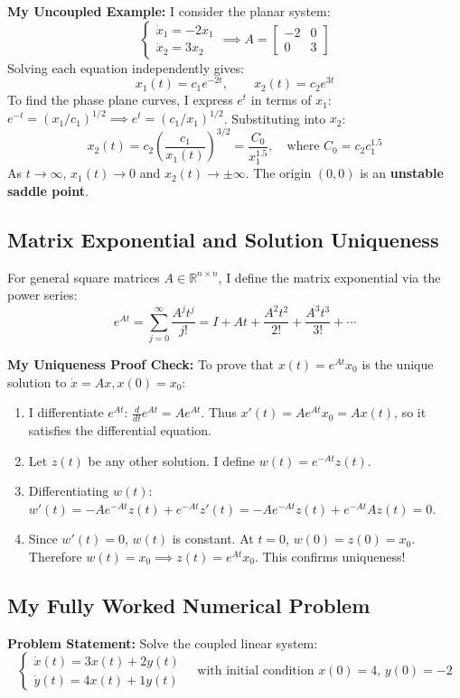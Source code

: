 \documentclass[12pt,a4paper]{article}
\theoremstyle{definition}
\theoremstyle{plain}
\begin{document}
\textbf{My Uncoupled Example:} I consider the planar system:
\[
\begin{cases}
\dot{x}_1 = -2 x_1 \\
\dot{x}_2 = 3 x_2
\end{cases}
\implies A = \begin{bmatrix} -2 & 0 \\ 0 & 3 \end{bmatrix}
\]
Solving each equation independently gives:
\[
x_1(t) = c_1 e^{-2t}, \qquad x_2(t) = c_2 e^{3t}
\]
To find the phase plane curves, I express $e^t$ in terms of $x_1$: $e^{-t} = (x_1 / c_1)^{1/2} \implies e^t = (c_1 / x_1)^{1/2}$. Substituting into $x_2$:
\[
x_2(t) = c_2 \left( \frac{c_1}{x_1(t)} \right)^{3/2} = \frac{C_0}{x_1^{1.5}}, \quad \text{where } C_0 = c_2 c_1^{1.5}
\]
As $t \to \infty$, $x_1(t) \to 0$ and $x_2(t) \to \pm \infty$. The origin $(0,0)$ is an \textbf{unstable saddle point}.

\subsection{Matrix Exponential and Solution Uniqueness}
For general square matrices $A \in \mathbb{R}^{n \times n}$, I define the matrix exponential via the power series:
\[
e^{At} = \sum_{j=0}^{\infty} \frac{A^j t^j}{j!} = I + A t + \frac{A^2 t^2}{2!} + \frac{A^3 t^3}{3!} + \cdots
\]

\textbf{My Uniqueness Proof Check:} To prove that $x(t) = e^{At} x_0$ is the unique solution to $\dot{x} = A x, x(0) = x_0$:
\begin{enumerate}
    \item I differentiate $e^{At}$: $\frac{d}{dt} e^{At} = A e^{At}$. Thus $x'(t) = A e^{At} x_0 = A x(t)$, so it satisfies the differential equation.
    \item Let $z(t)$ be any other solution. I define $w(t) = e^{-At} z(t)$.
    \item Differentiating $w(t)$: $w'(t) = -A e^{-At} z(t) + e^{-At} z'(t) = -A e^{-At} z(t) + e^{-At} A z(t) = 0$.
    \item Since $w'(t) = 0$, $w(t)$ is constant. At $t=0$, $w(0) = z(0) = x_0$. Therefore $w(t) = x_0 \implies z(t) = e^{At} x_0$. This confirms uniqueness!
\end{enumerate}

\subsection{My Fully Worked Numerical Problem}
\textbf{Problem Statement:} Solve the coupled linear system:
\[
\begin{cases}
\dot{x}(t) = 3 x(t) + 2 y(t) \\
\dot{y}(t) = 4 x(t) + 1 y(t)
\end{cases}
\quad \text{with initial condition } x(0) = 4, \, y(0) = -2
\]
\end{document}
